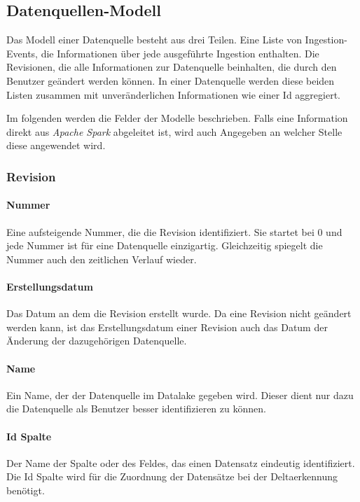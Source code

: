 \subsection{Datenquellen-Modell}
\label{sec:datasourcemodel}

Das Modell einer Datenquelle besteht aus drei Teilen.
Eine Liste von Ingestion-Events, die Informationen über jede ausgeführte Ingestion enthalten.
Die Revisionen, die alle Informationen zur Datenquelle beinhalten, die durch den Benutzer geändert werden können.
In einer Datenquelle werden diese beiden Listen zusammen mit unveränderlichen Informationen wie einer Id aggregiert.

Im folgenden werden die Felder der Modelle beschrieben.
Falls eine Information direkt aus \textit{Apache Spark} abgeleitet ist, wird auch Angegeben an welcher Stelle diese angewendet wird.

\subsubsection*{Revision} 
    
\paragraph{Nummer} 
Eine aufsteigende Nummer, die die Revision identifiziert.
Sie startet bei 0 und jede Nummer ist für eine Datenquelle einzigartig.
Gleichzeitig spiegelt die Nummer auch den zeitlichen Verlauf wieder. 

\paragraph{Erstellungsdatum} 
Das Datum an dem die Revision erstellt wurde.
Da eine Revision nicht geändert werden kann, ist das Erstellungsdatum einer Revision auch das Datum der Änderung der dazugehörigen Datenquelle.

\paragraph{Name} 
Ein Name, der der Datenquelle im Datalake gegeben wird.
Dieser dient nur dazu die Datenquelle als Benutzer besser identifizieren zu können.

\paragraph{Id Spalte} 
Der Name der Spalte oder des Feldes, das einen Datensatz eindeutig identifiziert.
Die Id Spalte wird für die Zuordnung der Datensätze bei der Deltaerkennung benötigt.

